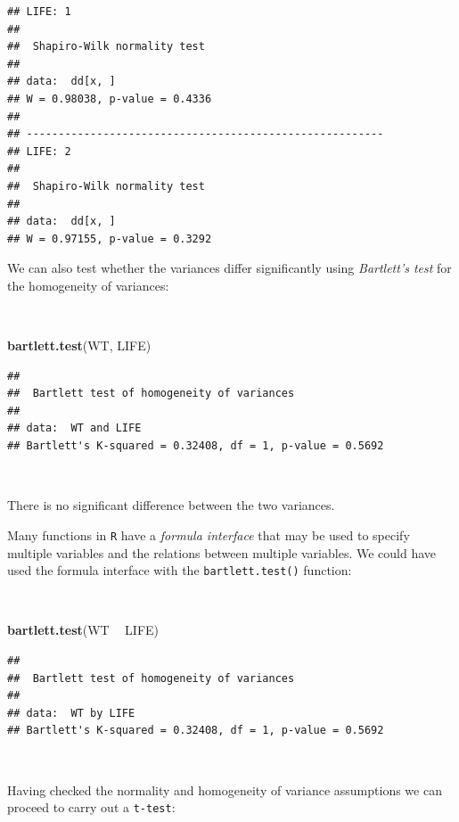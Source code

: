 \documentclass[12pt,a4paper]{book}
\newenvironment{Shaded}{\begin{snugshade}}{\end{snugshade}}
\newcommand{\KeywordTok}[1]{\textcolor[rgb]{0.13,0.29,0.53}{\textbf{#1}}}
\newcommand{\StringTok}[1]{\textcolor[rgb]{0.31,0.60,0.02}{#1}}
\newcommand{\OperatorTok}[1]{\textcolor[rgb]{0.81,0.36,0.00}{\textbf{#1}}}
\newcommand{\NormalTok}[1]{#1}
\theoremstyle{definition}
\theoremstyle{definition}
\theoremstyle{definition}
\theoremstyle{remark}
\begin{document}
\begin{verbatim}
## LIFE: 1
## 
##  Shapiro-Wilk normality test
## 
## data:  dd[x, ]
## W = 0.98038, p-value = 0.4336
## 
## -------------------------------------------------------- 
## LIFE: 2
## 
##  Shapiro-Wilk normality test
## 
## data:  dd[x, ]
## W = 0.97155, p-value = 0.3292
\end{verbatim}

\newpage

We can also test whether the variances differ significantly using
\emph{Bartlett's test} for the homogeneity of variances:

~

\begin{Shaded}
\begin{Highlighting}[]
\KeywordTok{bartlett.test}\NormalTok{(WT, LIFE)}
\end{Highlighting}
\end{Shaded}

\begin{verbatim}
## 
##  Bartlett test of homogeneity of variances
## 
## data:  WT and LIFE
## Bartlett's K-squared = 0.32408, df = 1, p-value = 0.5692
\end{verbatim}

~

There is no significant difference between the two variances.

Many functions in \texttt{R} have a \emph{formula interface} that may be
used to specify multiple variables and the relations between multiple
variables. We could have used the formula interface with the
\texttt{bartlett.test()} function:

~

\begin{Shaded}
\begin{Highlighting}[]
\KeywordTok{bartlett.test}\NormalTok{(WT }\OperatorTok{~}\StringTok{ }\NormalTok{LIFE)}
\end{Highlighting}
\end{Shaded}

\begin{verbatim}
## 
##  Bartlett test of homogeneity of variances
## 
## data:  WT by LIFE
## Bartlett's K-squared = 0.32408, df = 1, p-value = 0.5692
\end{verbatim}

~

Having checked the normality and homogeneity of variance assumptions we
can proceed to carry out a \texttt{t-test}:
\end{document}
